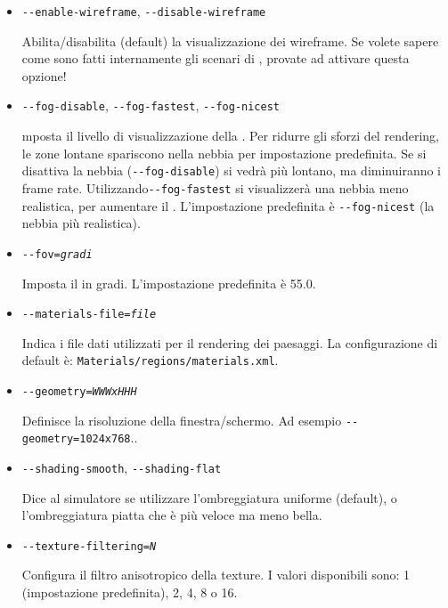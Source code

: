 \begin{itemize}
{\begin{itemize}
  Attiva (default)/disabilita l'uso di texture.

  \item{\texttt{-$ $-enable-wireframe}, \texttt{-$ $-disable-wireframe}}

  Abilita/disabilita (default) la visualizzazione dei wireframe.
  Se volete sapere come sono fatti internamente gli scenari di \FlightGear{},
  provate ad attivare questa opzione! 

  \item{\texttt{-$ $-fog-disable}, \texttt{-$ $-fog-fastest}, \texttt{-$ $-fog-nicest}}

  mposta il livello di visualizzazione della . Per ridurre gli sforzi del rendering,
  le zone lontane spariscono nella nebbia per impostazione predefinita. Se si disattiva la nebbia
  (\texttt{-$ $-fog-disable}) si vedr\`{a} pi\`{u} lontano, ma diminuiranno i frame rate.
  Utilizzando\texttt{-$ $-fog-fastest} si visualizzer\`{a} una nebbia meno realistica,
  per aumentare il . L'impostazione predefinita \`{e}  \texttt{-$ $-fog-nicest}
  (la nebbia pi\`{u} realistica).

  \item{\texttt{-$ $-fov={\it gradi}}}

  Imposta il  in gradi. L'impostazione predefinita \`{e} 55.0.

  \item{\texttt{-$ $-materials-file={\it file}}}

  Indica i file dati utilizzati per il rendering dei paesaggi.
  La configurazione di default \`{e}:  \texttt{Materials/regions/materials.xml}.

  \item{\texttt{-$ $-geometry={\it WWWxHHH}}}

  Definisce la risoluzione della finestra/schermo.
  Ad esempio \texttt{-$ $-geometry=1024x768}..

  \item{\texttt{-$ $-shading-smooth}, \texttt{-$ $-shading-flat}}

  Dice al simulatore se utilizzare l'ombreggiatura uniforme (default), o
  l'ombreggiatura piatta che \`{e} pi\`{u} veloce ma meno bella.

  \item{\texttt{-$ $-texture-filtering={\it N}}}

  Configura il filtro anisotropico della texture. I valori disponibili sono: 1
  (impostazione predefinita), 2, 4, 8 o 16.


\end{itemize}}
\end{itemize}
